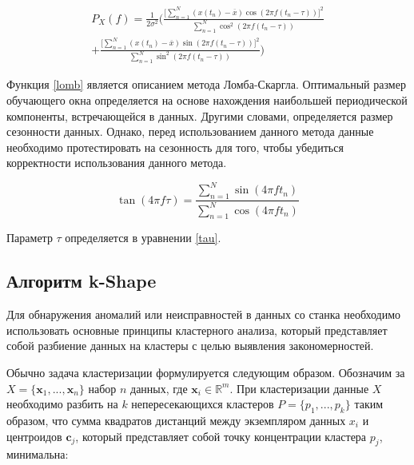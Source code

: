 \begin{equation} \label{lomb}
    \begin{gathered}
    P_X(f) = \frac{1}{2\sigma^2} 
    \Bigg( 
        \frac{\big[
            \sum_{n=1}^N(x(t_n) - \overline{x})\cos(2\pi f(t_n-\tau))
        \big]^2}{\sum_{n=1}^N \cos^2(2\pi f(t_n-\tau))} \\
    + 
    \frac{\big[
            \sum_{n=1}^N(x(t_n) - \overline{x})\sin(2\pi f(t_n-\tau))
        \big]^2}{\sum_{n=1}^N \sin^2(2\pi f(t_n-\tau))}
    \Bigg)
\end{gathered}
\end{equation}



Функция \ref{lomb} является описанием метода Ломба-Скаргла.
Оптимальный размер обучающего окна определяется
на основе нахождения наибольшей периодической компоненты,
встречающейся в данных.
Другими словами, определяется
размер сезонности данных.
Однако, перед использованием данного метода данные необходимо 
протестировать на сезонность для того, чтобы убедиться корректности использования
данного метода.

\begin{equation} \label{tau}
    \tan(4\pi f \tau) = \frac{\sum_{n=1}^N \sin(4\pi f t_n)}{\sum_{n=1}^N \cos(4\pi f t_n)}
\end{equation}

Параметр $\tau$ определяется в уравнении \ref{tau}.


\subsection{Алгоритм k-Shape}

Для обнаружения аномалий или неисправностей в данных со станка необходимо использовать
основные принципы кластерного анализа, который представляет собой разбиение
данных на кластеры с целью выявления закономерностей.

Обычно задача кластеризации формулируется следующим образом.
Обозначим за $X = \{\textbf{x}_1, ..., \textbf{x}_n \}$ набор $n$ данных, где $\textbf{x}_i \in \mathbb{R}^m$.
При кластеризации данные $X$  необходимо разбить на $k$ непересекающихся кластеров $P = \{p_1, ..., p_k\}$ таким образом,
что сумма квадратов дистанций между экземпляром данных $x_i$ и центроидов $\textbf{c}_j$,
который представляет собой точку концентрации кластера $p_j$, минимальна:

